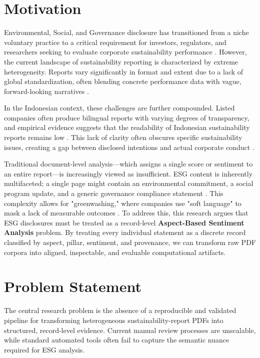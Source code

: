 
\section{Motivation}

Environmental, Social, and Governance disclosure has transitioned from a niche voluntary practice to a critical requirement for investors, regulators, and researchers seeking to evaluate corporate sustainability performance  \parencite{hans_bonde_christensen_45b44695}. However, the current landscape of sustainability reporting is characterized by extreme heterogeneity. Reports vary significantly in format and extent due to a lack of global standardization, often blending concrete performance data with vague, forward-looking narratives  \parencite{habiba_al_shaer_c2f5394b}.

In the Indonesian context, these challenges are further compounded. Listed companies often produce bilingual reports with varying degrees of transparency, and empirical evidence suggests that the readability of Indonesian sustainability reports remains low  \parencite{desi_adhariani_543335d6}. This lack of clarity often obscures specific sustainability issues, creating a gap between disclosed intentions and actual corporate conduct  \parencite{marsdenia_010e13e7}.

Traditional document-level analysis—which assigns a single score or sentiment to an entire report—is increasingly viewed as insufficient. ESG content is inherently multifaceted; a single page might contain an environmental commitment, a social program update, and a generic governance compliance statement  \parencite{keane_ong_0a5de439}. This complexity allows for "greenwashing," where companies use "soft language" to mask a lack of measurable outcomes  \parencite{keane_ong_8fec4760}. To address this, this research argues that ESG disclosures must be treated as a record-level \textbf{Aspect-Based Sentiment Analysis} problem. By treating every individual statement as a discrete record classified by aspect, pillar, sentiment, and provenance, we can transform raw PDF corpora into aligned, inspectable, and evaluable computational artifacts.
\section{Problem Statement}

The central research problem is the absence of a reproducible and validated pipeline for transforming heterogeneous sustainability-report PDFs into structured, record-level evidence. Current manual review processes are unscalable, while standard automated tools often fail to capture the semantic nuance required for ESG analysis.

